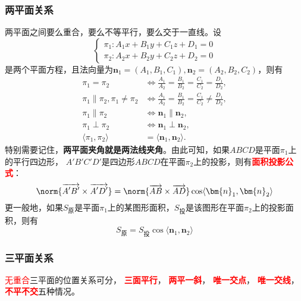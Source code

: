 \subsubsection{两平面关系}
两平面之间要么重合，要么不等平行，要么交于一直线。设
\[
    \begin{cases}
        \pi_1 : A_1x+B_1y+C_1z+D_1=0 \\
        \pi_2 : A_2x+B_2y+C_2z+D_2=0
    \end{cases}
\]
是两个平面方程，且法向量为$\bm{n}_1=(A_1,B_1,C_1),\bm{n}_2=(A_2,B_2,C_2)$，则有
\begin{align*}
    \pi_1 = \pi_2                           & \iff \frac{A_1}{A_2} = \frac{B_1}{B_2} = \frac{C_1}{C_2} = \frac{D_1}{D_2},    \\
    \pi_1 \parallel \pi_2, \pi_1 \neq \pi_2 & \iff \frac{A_1}{A_2} = \frac{B_1}{B_2} = \frac{C_1}{C_2} \neq \frac{D_1}{D_2}, \\
    \pi_1 \parallel \pi_2                   & \iff \bm{n}_1 \parallel \bm{n}_2,                                              \\
    \pi_1 \perp \pi_2                       & \iff \bm{n}_1 \perp \bm{n}_2,                                                  \\
    \langle\pi_1,\pi_2\rangle               & = \langle\bm{n}_1,\bm{n}_2\rangle.
\end{align*}
特别需要记住，\textbf{\textsf{两平面夹角就是两法线夹角}}。由此可知，如果$ABCD$是平面$\pi_1$上的平行四边形，
$A'B'C'D'$是四边形$ABCD$在平面$\pi_2$上的投影，则有\textcolor{red}{\textbf{\textsf{面积投影公式}}}：
\[
    \norm{\overrightarrow{A'B'}\times\overrightarrow{A'D'}} = \norm{\overrightarrow{AB}\times\overrightarrow{AD}} \cos\langle\bm{n}_1,\bm{n}_2\rangle
\]
更一般地，如果$S_\text{原}$是平面$\pi_1$上的某图形面积，$S_\text{投}$是该图形在平面$\pi_2$上的投影面积，则有
\begin{equation}
    \label{eq:面积投影公式}
    S_\text{原}  = S_\text{投}\cos\langle\bm{n}_1,\bm{n}_2\rangle
\end{equation}

\subsubsection{三平面关系}
\textcolor{red}{无重合}三平面的位置关系可分，
\textcolor{red}{\textbf{\textsf{三面平行}}}，
\textcolor{red}{\textbf{\textsf{两平一斜}}}，
\textcolor{red}{\textbf{\textsf{唯一交点}}}，
\textcolor{red}{\textbf{\textsf{唯一交线}}}，
\textcolor{red}{\textbf{\textsf{不平不交}}}五种情况。


